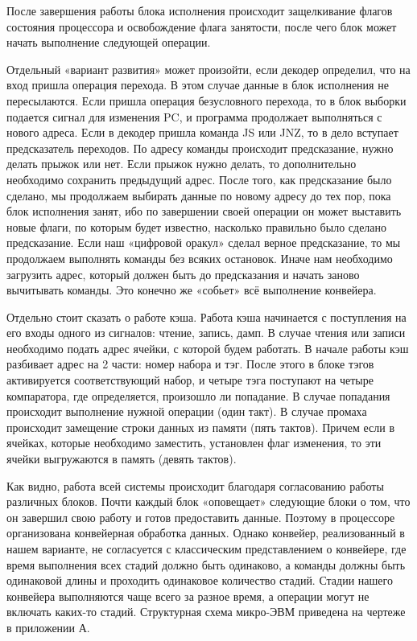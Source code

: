 После завершения работы блока исполнения происходит защелкивание флагов состояния процессора и освобождение флага занятости, после чего блок может начать выполнение следующей операции.

Отдельный «вариант развития» может произойти, если декодер определил, что на вход пришла операция перехода. В этом случае данные в блок исполнения не пересылаются. Если пришла операция безусловного перехода, то в блок выборки подается сигнал для изменения PC, и программа продолжает выполняться с нового адреса. Если в декодер пришла команда JS или JNZ, то в дело вступает предсказатель переходов. По адресу команды происходит предсказание, нужно делать прыжок или нет. Если прыжок нужно делать, то дополнительно необходимо сохранить предыдущий адрес. После того, как предсказание было сделано, мы продолжаем выбирать данные по новому адресу до тех пор, пока блок исполнения занят, ибо по завершении своей операции он может выставить новые флаги, по которым будет известно, насколько правильно было сделано предсказание. Если наш «цифровой оракул» сделал верное предсказание, то мы продолжаем выполнять команды без всяких остановок. Иначе нам необходимо загрузить адрес, который должен быть до предсказания и начать заново вычитывать команды. Это конечно же «собьет» всё выполнение конвейера.

Отдельно стоит сказать о работе кэша. Работа кэша начинается с поступления на его входы одного из сигналов: чтение, запись, дамп. В случае чтения или записи необходимо подать адрес ячейки, с которой будем работать. В начале работы кэш разбивает адрес на 2 части: номер набора и тэг. После этого в блоке тэгов активируется соответствующий набор, и четыре тэга поступают на четыре компаратора, где определяется, произошло ли попадание. В случае попадания происходит выполнение нужной операции (один такт). В случае промаха происходит замещение строки данных из памяти (пять тактов). Причем если в ячейках, которые необходимо заместить,  установлен флаг изменения, то эти ячейки выгружаются в память (девять тактов).

Как видно, работа всей системы происходит благодаря согласованию работы различных блоков. Почти каждый блок «оповещает» следующие блоки о том, что он завершил свою работу и готов предоставить данные. Поэтому в процессоре организована конвейерная обработка данных. Однако конвейер, реализованный в нашем варианте, не согласуется с классическим представлением о конвейере, где время выполнения всех стадий должно быть одинаково, а команды должны быть одинаковой длины и проходить одинаковое количество стадий. Стадии нашего конвейера выполняются чаще всего за разное время, а операции могут не включать каких-то стадий.
Структурная схема микро-ЭВМ приведена на чертеже в приложении А.




